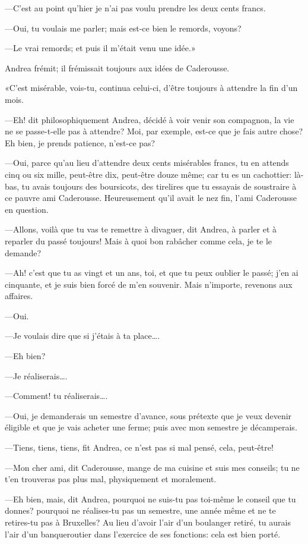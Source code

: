—C'est au point qu'hier je n'ai pas voulu prendre les deux cents francs. 

—Oui, tu voulais me parler; mais est-ce bien le remords, voyons? 

—Le vrai remords; et puis il m'était venu une idée.» 

Andrea frémit; il frémissait toujours aux idées de Caderousse. 

«C'est misérable, vois-tu, continua celui-ci, d'être toujours à attendre la fin d'un mois. 

—Eh! dit philosophiquement Andrea, décidé à voir venir son compagnon, la vie ne se passe-t-elle pas à attendre? Moi, par exemple, est-ce que je fais autre chose? Eh bien, je prends patience, n'est-ce pas? 

—Oui, parce qu'au lieu d'attendre deux cents misérables francs, tu en attends cinq ou six mille, peut-être dix, peut-être douze même; car tu es un cachottier: là-bas, tu avais toujours des boursicots, des tirelires que tu essayais de soustraire à ce pauvre ami Caderousse. Heureusement qu'il avait le nez fin, l'ami Caderousse en question. 

—Allons, voilà que tu vas te remettre à divaguer, dit Andrea, à parler et à reparler du passé toujours! Mais à quoi bon rabâcher comme cela, je te le demande? 

—Ah! c'est que tu as vingt et un ans, toi, et que tu peux oublier le passé; j'en ai cinquante, et je suis bien forcé de m'en souvenir. Mais n'importe, revenons aux affaires. 

—Oui. 

—Je voulais dire que si j'étais à ta place\dots. 

—Eh bien? 

—Je réaliserais\dots. 

—Comment! tu réaliserais\dots. 

—Oui, je demanderais un semestre d'avance, sous prétexte que je veux devenir éligible et que je vais acheter une ferme; puis avec mon semestre je décamperais. 

—Tiens, tiens, tiens, fit Andrea, ce n'est pas si mal pensé, cela, peut-être! 

—Mon cher ami, dit Caderousse, mange de ma cuisine et suis mes conseils; tu ne t'en trouveras pas plus mal, physiquement et moralement. 

—Eh bien, mais, dit Andrea, pourquoi ne suis-tu pas toi-même le conseil que tu donnes? pourquoi ne réalises-tu pas un semestre, une année même et ne te retires-tu pas à Bruxelles? Au lieu d'avoir l'air d'un boulanger retiré, tu aurais l'air d'un banqueroutier dans l'exercice de ses fonctions: cela est bien porté. 

